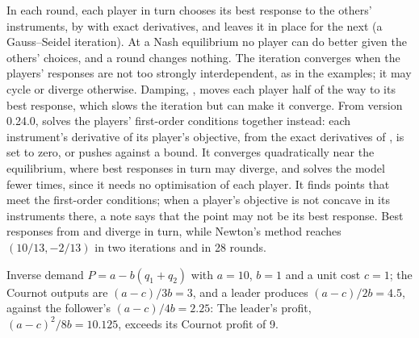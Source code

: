 In each round, each player in turn chooses its best response to the others'
instruments, by  with exact derivatives, and leaves it in
place for the next (a Gauss--Seidel iteration). At a Nash equilibrium no
player can do better given the others' choices, and a round changes nothing.
The iteration converges when the players' responses are not too strongly
interdependent, as in the examples; it may cycle or diverge otherwise.
Damping, , moves each player half of the way to its best
response, which slows the iteration but can make it converge. From version
0.24.0,  solves the players' first-order conditions
together instead: each instrument's derivative of its player's objective,
from the exact derivatives of , is set to zero, or
pushes against a bound. It converges quadratically near the equilibrium,
where best responses in turn may diverge, and solves the model fewer times,
since it needs no optimisation of each player. It finds points that meet the
first-order conditions; when a player's objective is not concave in its
instruments there, a note says that the point may not be its best response.
Best responses from  and  diverge
in turn, while Newton's method reaches $(10/13, -2/13)$ in two iterations and
 in 28 rounds.


Inverse demand $P = a - b(q_1 + q_2)$ with $a = 10$, $b = 1$ and a unit cost
$c = 1$; the Cournot outputs are $(a - c)/3b = 3$, and a leader produces $(a -
c)/2b = 4.5$, against the follower's $(a - c)/4b = 2.25$:
The leader's profit, $(a - c)^2/8b = 10.125$, exceeds its Cournot profit of 9.


